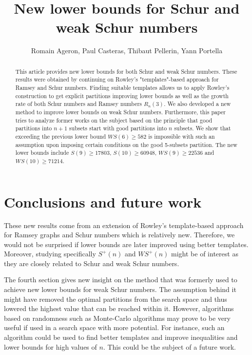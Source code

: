 \documentclass{article}
\title{New lower bounds for Schur and weak Schur numbers}
\author{Romain Ageron, Paul Casteras, Thibaut Pellerin, Yann Portella}
\newtheorem{computational theorem}{Computational Theorem}[section]
\newcommand{\WS}{\mathit{WS}}
\begin{document}
\maketitle

\begin{abstract}

This article provides new lower bounds for both Schur and weak Schur numbers. These results were obtained by continuing on
Rowley's "templates"-based approach for Ramsey and Schur numbers. Finding suitable templates allows us to apply Rowley's construction
to get explicit partitions improving lower bounds as well as the growth rate of both Schur numbers and Ramsey numbers \(R_n(3)\).
We also developed a new method to improve lower bounds on weak Schur numbers. Furthermore, this paper tries to analyze former
works on the subject based on the principle that good partitions into \(n+1\) subsets start with good partitions
into \(n\) subsets. We show that exceeding the previous lower bound \(\WS (6) \geqslant 582\) is impossible with such an assumption upon
imposing certain conditions on the good 5-subsets partition. The new lower bounds include \(S(9) \geqslant 17803\), \(S(10) \geqslant 60948\),
\(\WS (9) \geqslant 22536 \) and \(\WS (10) \geqslant 71214 \).

\end{abstract}















\section{Conclusions and future work}

\par
These new results come from an extension of Rowley's template-based approach for Ramsey graphs and Schur numbers which is relatively new.
Therefore, we would not be surprised if lower bounds are later improved using better templates. Moreover, studying specifically \(S^+(n)\) and
\(\WS^+(n)\) might be of interest as they are closely related to Schur and weak Schur numbers.

\par
The fourth section gives new insight on the method that was formerly used to achieve new lower bounds for weak Schur numbers. The assumption behind it
might have removed the optimal partitions from the search space and thus lowered the highest value that can be reached within it.
However, algorithms based on randomness such as Monte-Carlo algorithms may prove to be very useful if used in a search space with more
potential. For instance, such an algorithm could be used to find better templates and improve inequalities and lower bounds for high values
of \(n\). This could be the subject of a future work.
\end{document}
